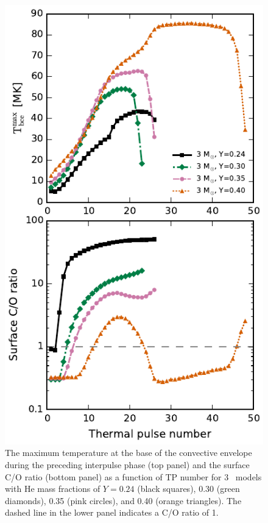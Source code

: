 \begin{figure}
 \begin{center}\includegraphics[height=0.82\textheight]{fig-hbb-3msun.pdf}\end{center}
 \caption{The maximum temperature at the base of the convective envelope during the preceding interpulse phase (top panel) and the surface C/O ratio (bottom panel) as a function of TP number for 3 \Msun\ models with He mass fractions of $Y= 0.24$ (black squares), 0.30 (green diamonds), 0.35 (pink circles), and 0.40 (orange triangles). The dashed line in the lower panel indicates a C/O ratio of 1.}\label{fig:hbb-3msun}
\end{figure}

